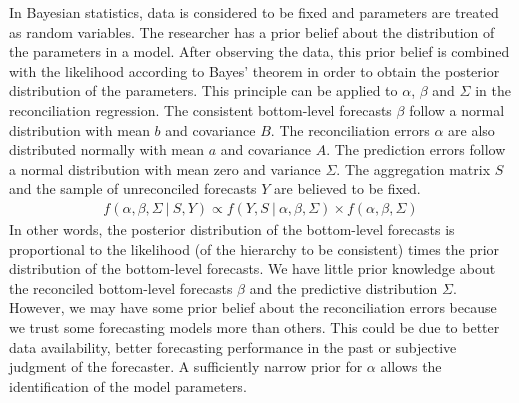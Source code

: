 \documentclass[a4paper,fleqn,11pt]{article}
\begin{document}
In Bayesian statistics, data is considered to be fixed and parameters are treated as random variables. The researcher has a prior belief about the distribution of the parameters in a model. After observing the data, this prior belief is combined with the likelihood according to Bayes' theorem in order to obtain the posterior distribution of the parameters. This principle can be applied to $\alpha$, $\beta$ and $\Sigma$ in the reconciliation regression. The consistent bottom-level forecasts $\beta$ follow a normal distribution with mean $b$ and covariance $B$. The reconciliation errors $\alpha$ are also distributed normally with mean $a$ and covariance $A$. The prediction errors follow a normal distribution with mean zero and variance $\Sigma$. The aggregation matrix $S$ and the sample of unreconciled forecasts $Y$ are believed to be fixed.
\begin{align}
f(\alpha, \beta, \Sigma\ |\ S,Y) \propto f(Y,S\ |\ \alpha, \beta, \Sigma) \times f(\alpha, \beta, \Sigma)
\end{align}
In other words, the posterior distribution of the bottom-level forecasts is proportional to the likelihood (of the hierarchy to be consistent) times the prior distribution of the bottom-level forecasts. We have little prior knowledge about the reconciled bottom-level forecasts $\beta$ and the predictive distribution $\Sigma$. However, we may have some prior belief about the reconciliation errors because we trust some forecasting models more than others. This could be due to better data availability, better forecasting performance in the past or subjective judgment of the forecaster. A sufficiently narrow prior for $\alpha$ allows the identification of the model parameters.\\
\end{document}
